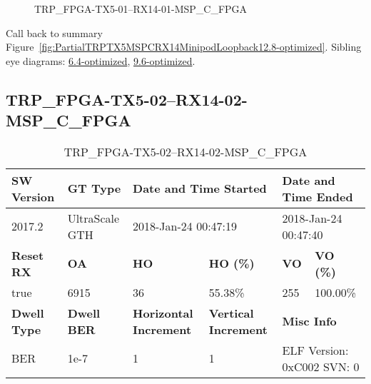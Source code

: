 \begin{figure}[h]
\caption{TRP\_FPGA-TX5-01--RX14-01-MSP\_C\_FPGA} \label{fig:TRPFPGATX501RX1401MSPCFPGA12.8-optimized}
\end{figure}

Call back to summary Figure~\ref{fig:PartialTRPTX5MSPCRX14MinipodLoopback12.8-optimized}.
Sibling eye diagrams: \hyperref[sec:TRPFPGATX501RX1401MSPCFPGA6.4-optimized]{6.4-optimized}, \hyperref[sec:TRPFPGATX501RX1401MSPCFPGA9.6-optimized]{9.6-optimized}.

\clearpage
\newpage


\subsection{TRP\_FPGA-TX5-02--RX14-02-MSP\_C\_FPGA}\label{sec:TRPFPGATX502RX1402MSPCFPGA12.8-optimized}

\begin{table}[h]
\centering
\caption{TRP\_FPGA-TX5-02--RX14-02-MSP\_C\_FPGA}
\label{tab:TRPFPGATX502RX1402MSPCFPGA12.8-optimized}
\begin{tabular}{@{}|l|l|l|l|l|l|@{}}
\toprule
\textbf{SW Version}                & \textbf{GT Type}   & \multicolumn{2}{l|}{\textbf{Date and Time Started}}            & \multicolumn{2}{l|}{\textbf{Date and Time Ended}}        \\ \midrule
2017.2                       & UltraScale GTH          & \multicolumn{2}{l|}{2018-Jan-24 00:47:19}                   & \multicolumn{2}{l|}{2018-Jan-24 00:47:40}               \\ \midrule
\textbf{Reset RX}                  & \textbf{OA} & \textbf{HO}   & \textbf{HO (\%)} & \textbf{VO} & \textbf{VO (\%)} \\ \midrule
true & 6915        & 36          & 55.38\%        & 255        & 100.00\%       \\ \midrule
\textbf{Dwell Type}                & \textbf{Dwell BER} & \textbf{Horizontal Increment} & \textbf{Vertical Increment}    & \multicolumn{2}{l|}{\textbf{Misc Info}}                  \\ \midrule
BER                            & 1e-7        & 1        & 1           & \multicolumn{2}{l|}{ELF Version: 0xC002 SVN: 0}                         \\ \bottomrule
\end{tabular}
\end{table}

